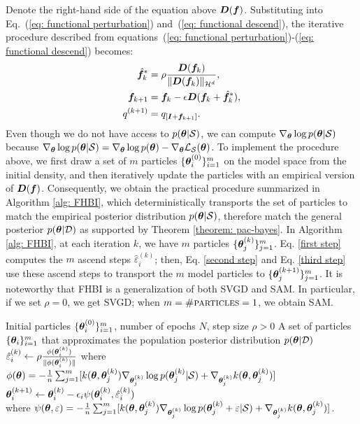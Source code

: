 Denote the right-hand side of the equation above ${\bm{D}}({\bm{f}})$. Substituting into Eq.~(\ref{eq: functional perturbation}) and~(\ref{eq: functional descend}), the iterative procedure described from equations~(\ref{eq: functional perturbation})-(\ref{eq: functional descend}) becomes:
\begin{align}
    \hat{{\bm{f}}}^*_k &= \rho\frac{{\bm{D}}({\bm{f}}_k)}{\|{\bm{D}}({\bm{f}}_k)\|_{{\mathcal{H}}^d}},
        \label{first step}\\
    {\bm{f}}_{k+1} &= {\bm{f}}_k -\epsilon {\bm{D}}({\bm{f}}_k + \hat{{\bm{f}}}^*_k),    \label{second step}\\
    q^{(k+1)} &=q_{[{\bm{I}} + {\bm{f}}_{k+1}]}.
        \label{third step}
\end{align}
Even though we do not have access to $p({\bm{\theta}} | {\mathcal{S}})$, we can compute $\nabla_{\bm{\theta}} \log p({\bm{\theta}} | {\mathcal{S}})$ because $\nabla_{\bm{\theta}} \log p({\bm{\theta}} | {\mathcal{S}}) = \nabla_{\bm{\theta}} \log p({\bm{\theta}}) -   \nabla_{\bm{\theta}} {\mathcal{L}}_{\mathcal{S}}({\bm{\theta}})$. To implement the procedure above, we first draw a set of $m$ particles $\{{\bm{\theta}}_i^{(0)}\}^m_{i=1}$ on the model space from the initial density, and then iteratively update the particles with an empirical version of ${\bm{D}}({\bm{f}})$. Consequently, we obtain the practical procedure summarized in Algorithm \ref{alg: FHBI}, which deterministically transports the set of particles to match the empirical posterior distribution $p({\bm{\theta}} | {\mathcal{S}})$, therefore match the general posterior $p({\bm{\theta}} | {\mathcal{D}})$ as supported by Theorem \ref{theorem: pac-bayes}. In Algorithm \ref{alg: FHBI}, at each iteration $k$, we have $m$ particles $\{{\bm{\theta}}^{(k)}_j\}_{j=1}^m$. Eq. \ref{first step} computes the $m$ ascend steps $\hat{\varepsilon}_i^{(k)}$; then, Eq. \ref{second step} and Eq. \ref{third step} use these ascend steps to transport the $m$ model particles to $\{{\bm{\theta}}^{(k+1)}_j\}_{j=1}^m$. It is noteworthy that FHBI is a generalization of both SVGD and SAM. In particular, if we set $\rho = 0$, we get SVGD; when $m=\textsc{\#particles} = 1$, we obtain SAM. 

\begin{algorithm}[tb]
   \caption{\textsc{Flat Hilbert Bayesian Inference (FHBI)}}
   \label{alg: FHBI}
\begin{algorithmic}
    Initial particles $\{{\bm{\theta}}^{(0)}_i\}^m_{i=1}$, number of epochs $N$, step size $\rho > 0$
 A set of particles $\{{\bm{\theta}}_i\}^m_{i=1}$ that approximates the population posterior distribution $p({\bm{\theta}}|{\mathcal{D}})$
    \STATE $\hat{\varepsilon}_i^{(k)} \leftarrow \rho\frac{\mathbb{\phi}({\bm{\theta}}^{(k)}_i)}{\|\phi({\bm{\theta}}_i^{(k)})\|}$ where  $\mathbb{\phi}({\bm{\theta}}) = -\frac{1}{n}\sum_{j=1}^m[k({\bm{\theta}}, {\bm{\theta}}_j^{(k)})\nabla_{{\bm{\theta}}_j^{(k)}}\log p({\bm{\theta}}_j^{(k)} | {\mathcal{S}}) + \nabla_{{\bm{\theta}}_j^{(k)}} k({\bm{\theta}}, {\bm{\theta}}_j^{(k)})]$ 
    \STATE ${\bm{\theta}}_i^{(k+1)} \leftarrow {\bm{\theta}}_i^{(k)} - \epsilon_i \psi({\bm{\theta}}_i^{(k)}, \hat{\varepsilon}^{(k)}_i)$ \\ 
    where $\psi({\bm{\theta}}, \varepsilon) = -\frac{1}{n}\sum_{j=1}^m[k({\bm{\theta}}, {\bm{\theta}}_j^{(k)})\nabla_{{\bm{\theta}}_j^{(k)}}\log p({\bm{\theta}}_j^{(k)}+\varepsilon| {\mathcal{S}}) + \nabla_{{\bm{\theta}}_j^{(k)}} k({\bm{\theta}}, {\bm{\theta}}_j^{(k)})]$.
   \ENDFOR
\end{algorithmic}
\end{algorithm}

